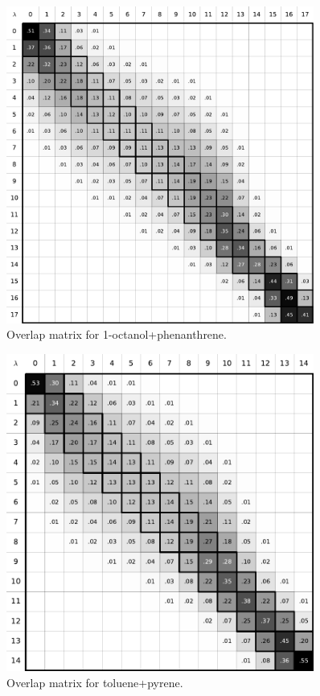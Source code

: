\documentclass[
	12pt,				%
	openany,			%
	oneside,			%
	a4paper,			%
	english,			%
	brazil				%
	]{abntex2}
\begin{document}
\begin{apendicesenv}
\begin{figure}[H]
	\centering
	\includegraphics[width=0.9\textwidth]{Figures/ooct_phen}
	\caption{Overlap matrix for 1-octanol+phenanthrene.}
\end{figure}

\begin{figure}[H]
	\centering
	\includegraphics[width=0.9\textwidth]{Figures/otol_pyr}
	\caption{Overlap matrix for toluene+pyrene.}
\end{figure}


\end{apendicesenv}
\end{document}
